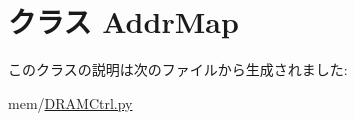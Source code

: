 \hypertarget{classDRAMCtrl_1_1AddrMap}{
\section{クラス AddrMap}
\label{classDRAMCtrl_1_1AddrMap}
}


このクラスの説明は次のファイルから生成されました:\begin{DoxyCompactItemize}
\item 
mem/\hyperlink{DRAMCtrl_8py}{DRAMCtrl.py}\end{DoxyCompactItemize}
